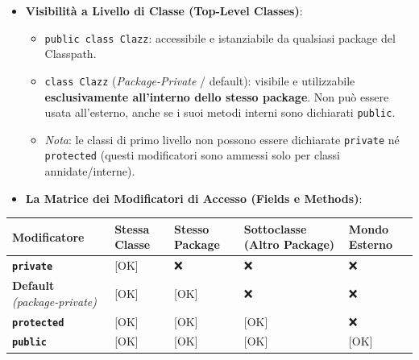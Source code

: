 \documentclass[11pt,a4paper,oneside]{report}
\newcommand{\passthrough}[1]{#1}
\providecommand{\tightlist}{\setlength{\itemsep}{0pt}\setlength{\parskip}{0pt}}
\begin{document}
\begin{itemize}
\tightlist
\item
  \textbf{Visibilità a Livello di Classe (Top-Level Classes)}:

  \begin{itemize}
  \tightlist
  \item
    \passthrough{\lstinline!public class Clazz!}: accessibile e
    istanziabile da qualsiasi package del Classpath.
  \item
    \passthrough{\lstinline!class Clazz!} (\emph{Package-Private} /
    default): visibile e utilizzabile \textbf{esclusivamente all'interno
    dello stesso package}. Non può essere usata all'esterno, anche se i
    suoi metodi interni sono dichiarati
    \passthrough{\lstinline!public!}.
  \item
    \emph{Nota}: le classi di primo livello non possono essere
    dichiarate \passthrough{\lstinline!private!} né
    \passthrough{\lstinline!protected!} (questi modificatori sono
    ammessi solo per classi annidate/interne).
  \end{itemize}
\item
  \textbf{La Matrice dei Modificatori di Accesso (Fields e Methods)}:
\end{itemize}

\begin{longtable}[]{@{}
  >{\raggedright\arraybackslash}p{}
  >{\centering\arraybackslash}p{}
  >{\centering\arraybackslash}p{}
  >{\centering\arraybackslash}p{}
  >{\centering\arraybackslash}p{}@{}}
\toprule\noalign{}
\begin{minipage}[b]{\linewidth}\raggedright
Modificatore
\end{minipage} & \begin{minipage}[b]{\linewidth}\centering
Stessa Classe
\end{minipage} & \begin{minipage}[b]{\linewidth}\centering
Stesso Package
\end{minipage} & \begin{minipage}[b]{\linewidth}\centering
Sottoclasse (Altro Package)
\end{minipage} & \begin{minipage}[b]{\linewidth}\centering
Mondo Esterno
\end{minipage} \\
\midrule\noalign{}
\endhead
\bottomrule\noalign{}
\endlastfoot
\textbf{\passthrough{\lstinline!private!}} & {[}OK{]} & ❌ & ❌ & ❌ \\
\textbf{Default} \emph{(package-private)} & {[}OK{]} & {[}OK{]} & ❌ &
❌ \\
\textbf{\passthrough{\lstinline!protected!}} & {[}OK{]} & {[}OK{]} &
{[}OK{]} & ❌ \\
\textbf{\passthrough{\lstinline!public!}} & {[}OK{]} & {[}OK{]} &
{[}OK{]} & {[}OK{]} \\
\end{longtable}
\end{document}

